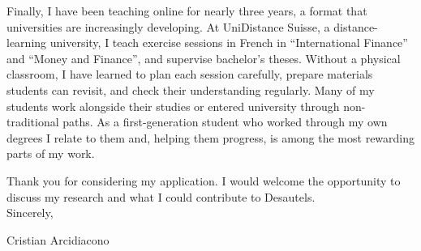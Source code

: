 \documentclass[11pt]{article}
\begin{document}
Finally, I have been teaching online for nearly three years, a format that universities are increasingly developing. At UniDistance Suisse, a distance-learning university, I teach exercise sessions in French in ``International Finance'' and ``Money and Finance'', and supervise bachelor's theses. Without a physical classroom, I have learned to plan each session carefully, prepare materials students can revisit, and check their understanding regularly. Many of my students work alongside their studies or entered university through non-traditional paths. As a first-generation student who worked through my own degrees I relate to them and, helping them progress, is among the most rewarding parts of my work. %

Thank you for considering my application. I would welcome the opportunity to discuss my research and what I could contribute to Desautels. \\

Sincerely,

Cristian Arcidiacono
\end{document}
